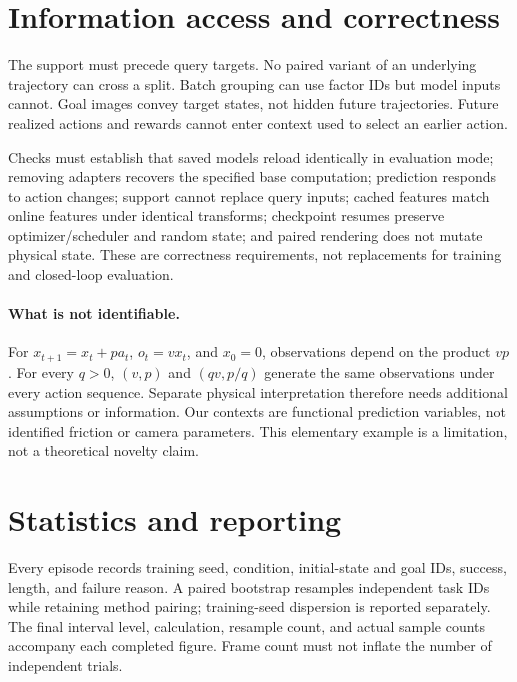 
\FloatBarrier
\section{Information access and correctness}
The support must precede query targets. No paired variant of an underlying
trajectory can cross a split. Batch grouping can use factor IDs but model
inputs cannot. Goal images convey target states, not hidden future
trajectories. Future realized actions and rewards cannot enter context
used to select an earlier action.

Checks must establish that saved models reload identically in evaluation
mode; removing adapters recovers the specified base computation; prediction
responds to action changes; support cannot replace query inputs; cached
features match online features under identical transforms; checkpoint
resumes preserve optimizer/scheduler and random state; and paired rendering
does not mutate physical state. These are correctness requirements,
not replacements for training and closed-loop evaluation.

\paragraph{What is not identifiable.}
For $x_{t+1}=x_t+p a_t$, $o_t=v x_t$, and $x_0=0$, observations depend on
the product $vp$. For every $q>0$, $(v,p)$ and $(qv,p/q)$ generate the same
observations under every action sequence. Separate physical interpretation
therefore needs additional assumptions or information. Our contexts are
functional prediction variables, not identified friction or camera
parameters. This elementary example is a limitation, not a theoretical novelty claim.

\FloatBarrier
\section{Statistics and reporting}
Every episode records training seed, condition, initial-state and goal IDs,
success, length, and failure reason. A paired bootstrap resamples independent
task IDs while retaining method pairing; training-seed dispersion is
reported separately. The final interval level, calculation, resample count,
and actual sample counts accompany each completed figure. Frame count
must not inflate the number of independent trials.

